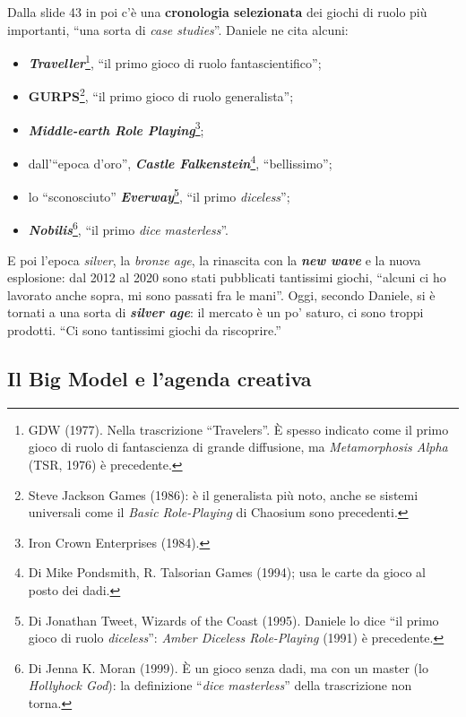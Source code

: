 Dalla slide 43 in poi c'è una \textbf{cronologia selezionata} dei giochi di ruolo più importanti,
``una sorta di \emph{case studies}''. Daniele ne cita alcuni:
\begin{itemize}
  \item \textbf{\emph{Traveller}}\footnote{GDW (1977). Nella trascrizione ``Travelers''. È spesso
        indicato come il primo gioco di ruolo di fantascienza di grande diffusione, ma
        \emph{Metamorphosis Alpha} (TSR, 1976) è precedente.}, ``il primo gioco di ruolo
        fantascientifico'';
  \item \textbf{GURPS}\footnote{Steve Jackson Games (1986): è il generalista più noto, anche se
        sistemi universali come il \emph{Basic Role-Playing} di Chaosium sono precedenti.}, ``il primo
        gioco di ruolo generalista'';
  \item \textbf{\emph{Middle-earth Role Playing}}\footnote{Iron Crown Enterprises (1984).};
  \item dall'``epoca d'oro'', \textbf{\emph{Castle Falkenstein}}\footnote{Di Mike Pondsmith, R.
        Talsorian Games (1994); usa le carte da gioco al posto dei dadi.}, ``bellissimo'';
  \item lo ``sconosciuto'' \textbf{\emph{Everway}}\footnote{Di Jonathan Tweet, Wizards of the Coast
        (1995). Daniele lo dice ``il primo gioco di ruolo \emph{diceless}'': \emph{Amber Diceless
        Role-Playing} (1991) è precedente.}, ``il primo \emph{diceless}'';
  \item \textbf{\emph{Nobilis}}\footnote{Di Jenna K. Moran (1999). È un gioco senza dadi, ma con un
        master (lo \emph{Hollyhock God}): la definizione ``\emph{dice masterless}'' della
        trascrizione non torna.}, ``il primo \emph{dice masterless}''.
\end{itemize}
E poi l'epoca \emph{silver}, la \emph{bronze age}, la rinascita con la \textbf{\emph{new wave}} e la
nuova esplosione: dal 2012 al 2020 sono stati pubblicati tantissimi giochi, ``alcuni ci ho lavorato
anche sopra, mi sono passati fra le mani''. Oggi, secondo Daniele, si è tornati a una sorta di
\textbf{\emph{silver age}}: il mercato è un po' saturo, ci sono troppi prodotti. ``Ci sono tantissimi
giochi da riscoprire.''

\subsection{Il Big Model e l'agenda creativa}



